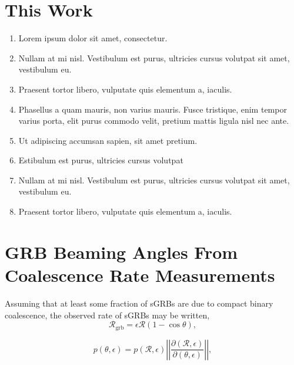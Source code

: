 \documentclass[a0,landscape]{a0poster}
\newcommand{\grbrate}{{{\mathcal R}_{\mathrm{grb}}}}
\newcommand{\cbcrate}{{{\mathcal R}}}
\begin{document}
\begin{multicols}{4}

\color{DarkSlateGray} %

\section*{This Work}

\begin{enumerate}
\item Lorem ipsum dolor sit amet, consectetur.
\item Nullam at mi nisl. Vestibulum est purus, ultricies cursus volutpat sit amet, vestibulum eu.
\item Praesent tortor libero, vulputate quis elementum a, iaculis.
\item Phasellus a quam mauris, non varius mauris. Fusce tristique, enim tempor varius porta, elit purus commodo velit, pretium mattis ligula nisl nec ante.
\item Ut adipiscing accumsan sapien, sit amet pretium.
\item Estibulum est purus, ultricies cursus volutpat
\item Nullam at mi nisl. Vestibulum est purus, ultricies cursus volutpat sit amet, vestibulum eu.
\item Praesent tortor libero, vulputate quis elementum a, iaculis.
\end{enumerate}


\section*{GRB Beaming Angles From Coalescence Rate Measurements}
Assuming that at least some fraction of sGRBs are due to compact binary
coalescence, the observed rate of sGRBs may be written,
%
\begin{equation}\label{eq:rate2angle}
\grbrate=\epsilon\cbcrate(1-\cos \theta),
\end{equation}

\begin{equation}
p(\theta,\epsilon) = p(\cbcrate,\epsilon)
\left\lvert\left\lvert
\frac{\partial(\cbcrate,\epsilon)}{\partial(\theta,\epsilon)}
\right\rvert\right\rvert,
\end{equation}


\end{multicols}
\end{document}
